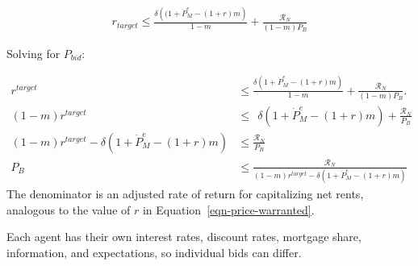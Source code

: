 \begin{eqnarray}
r_{target} \le \frac{\delta \left((1+ \dot P_M^e - (1+r)m\right)}{1-m} + \frac{\mathcal{R}_N}{(1-m)P_B}
\end{eqnarray}

Solving for $P_{bid}$:

\begin{align}
r^{target} &\le \frac{\delta \left(1 + \dot P_M^e - (1+r)m\right)}{1-m}   +\frac{\mathcal{R}_N}{(1-m)P_B}. \nonumber \\
(1-m)r^{target} &\le \ \ \delta \left(1 + \dot P_M^e - (1+r)m\right) + \frac{\mathcal{R}_N}{P_B} \nonumber \\ %
(1-m)r^{target} - \delta \left(1 + \dot P_M^e - (1+r)m\right)  &\le  \frac{\mathcal{R}_N}{P_B} \nonumber\\
P_B & \le    \frac{\mathcal{R}_N}{(1-m)r^{target}-\delta \left(1 + \dot P_M^e - (1+r)m\right)} 
\label{eqn-bid-price1}
\end{align}
The denominator is an adjusted rate of return for capitalizing net rents, analogous to the value of $r$ in Equation~\ref{eqn-price-warranted}. 

Each agent has their own interest rates, discount rates, mortgage share, information, and expectations, so individual bids can differ.





